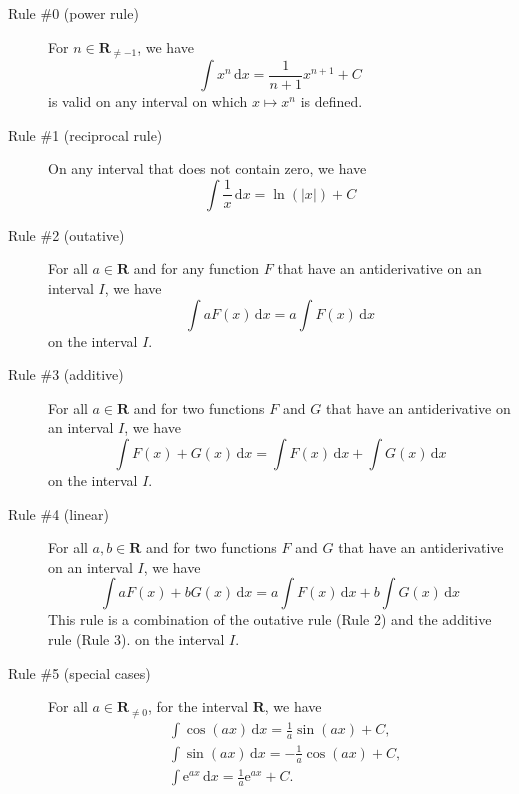 \documentclass[10pt,fleqn,answers]{exam}
\newcommand{\reals}{\mathbf{R}}
\begin{document}
\large




\begin{description}

\item[Rule \#0 (power rule)]  For $n \in \reals_{\neq -1}$, we have  
\begin{equation*}
 \int x^n \,  \mathrm{d} x = \frac{1}{n+1} x^{n+1}+C
 \end{equation*}
  is valid on any interval on which $x \mapsto x^n$ is defined. 

\item[Rule \#1 (reciprocal rule)]  On any interval that does not contain zero, we have 
\begin{equation*}
 \int \frac{1}{x} \,   \mathrm{d} x = \ln(|x|) + C
 \end{equation*}

\item[Rule \#2 (outative)]  For all $a \in \reals$ and for any function $F$ that have an antiderivative on an interval $I$, 
we have 
\begin{equation*}
  \int a F(x) \, \mathrm{d} x =  a \int F(x) \, \mathrm{d} x
 \end{equation*}
 on the interval $I$.

\item[Rule \#3 (additive)]  For all $a \in \reals$ and for two functions  $F$  and $G$ that have an antiderivative  on an interval $I$,  we have 
\begin{equation*}
  \int  F(x)  + G(x) \, \mathrm{d} x =   \int F(x) \, \mathrm{d} x + \int G(x) \, \mathrm{d} x 
\end{equation*}
 on the interval $I$.

\item[Rule \#4 (linear)] For all $a,b \in \reals$ and for two functions  $F$  and $G$ that have an antiderivative  on an interval $I$,  we have 
\begin{equation*}
  \int  a F(x)  + b G(x) \, \mathrm{d} x =   a \int F(x) \, \mathrm{d} x + b \int G(x) \, \mathrm{d} x 
\end{equation*}
This rule is a combination of the outative rule (Rule 2) and the additive rule (Rule 3).
 on the interval $I$.

\item[Rule \#5 (special cases)] For all $a \in \reals_{\neq 0}$, for the interval $\reals$, we have
\begin{align*}
 &\int \cos(a x) \, \mathrm{d} x = \frac{1}{a} \sin(a x) + C,\\
 &\int \sin(a x) \, \mathrm{d} x = -\frac{1}{a} \cos(a x) + C,\\
 &\int \mathrm{e}^{a x} \, \mathrm{d} x = \frac{1}{a} \mathrm{e}^{a x} + C.
\end{align*}


\end{description}
\end{document}
